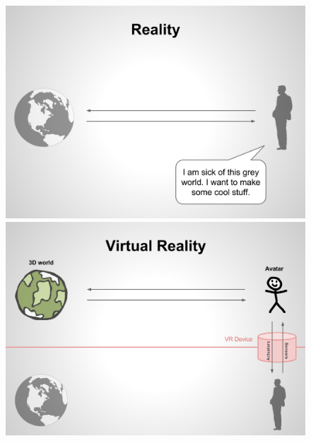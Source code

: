 \begin{figure}
\centering
\begin{subfigure}    
\begin{minipage}[t]{0.49\textwidth}
\includegraphics[width=\linewidth]{schemas/reality1}
\end{minipage}
\hspace{\fill}
\begin{minipage}[t]{0.49\textwidth}
\includegraphics[width=\linewidth]{schemas/virtualreality}
\end{minipage}


\end{subfigure}
\end{figure}
